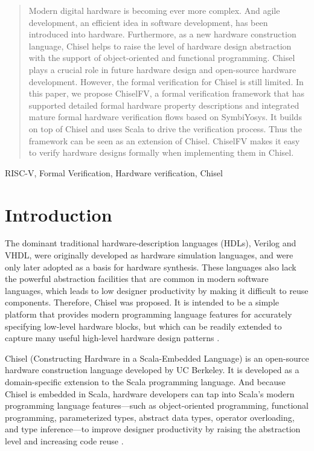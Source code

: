 \documentclass[conference]{IEEEtran}
\theoremstyle{definition}
\begin{document}
\begin{abstract}
    Modern digital hardware is becoming ever more complex. And agile development, an efficient idea in software development, has been introduced into hardware. Furthermore, as a new hardware construction language, Chisel helps to raise the level of hardware design abstraction with the support of object-oriented and functional programming. Chisel plays a crucial role in future hardware design and open-source hardware development. However, the formal verification for Chisel is still limited. In this paper, we propose ChiselFV, a formal verification framework that has supported detailed formal hardware property descriptions and integrated mature formal hardware verification flows based on SymbiYosys. It builds on top of Chisel and uses Scala to drive the verification process. Thus the framework can be seen as an extension of Chisel. ChiselFV makes it easy to verify hardware designs formally when implementing them in Chisel.
\end{abstract}

\begin{IEEEkeywords}
RISC-V, Formal Verification, Hardware verification, Chisel
\end{IEEEkeywords}

\section{Introduction}
The dominant traditional hardware-description languages (HDLs), Verilog and VHDL, were originally developed as hardware simulation languages, and were only later adopted as a basis for hardware synthesis. 
These languages also lack the powerful abstraction facilities that are common in modern software languages, which leads to low designer productivity by making it difficult to reuse components.
Therefore, Chisel was proposed.
It is intended to be a simple platform that provides modern programming language features for accurately specifying low-level hardware blocks, but which can be readily extended to capture many useful high-level hardware design patterns \cite{bachrach2012chisel}.

Chisel (Constructing Hardware in a Scala-Embedded Language) is an open-source hardware construction language developed by UC Berkeley. It is developed as a domain-specific extension to the Scala programming language. And because Chisel is embedded in Scala, hardware developers can tap into Scala’s modern programming language features—such as object-oriented programming, functional programming, parameterized types, abstract data types, operator overloading, and type inference—to improve designer productivity by raising the abstraction level and increasing code reuse \cite{lee2016agile}.
\end{document}
